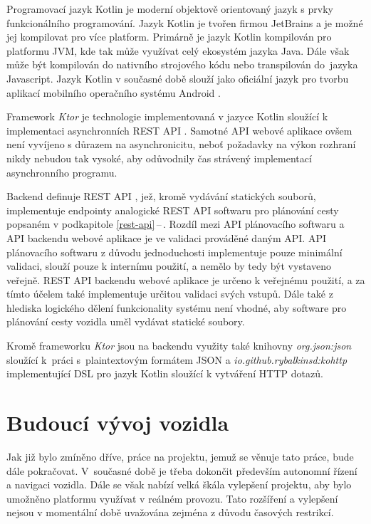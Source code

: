 \documentclass[czech, bachelor]{diploma}
\newcommand{\peteref}[1]{\ref{#1}\,--\,\nameref{#1}}
\begin{document}
Programovací jazyk Kotlin je moderní objektově orientovaný jazyk s prvky funkcionálního programování. Jazyk Kotlin je tvořen
firmou JetBrains a je možné jej kompilovat pro více platform. Primárně je jazyk Kotlin kompilován pro platformu JVM, kde tak může
využívat celý ekosystém jazyka Java. Dále však může být kompilován do nativního strojového kódu nebo transpilován do~jazyka
Javascript. Jazyk Kotlin v současné době slouží jako oficiální jazyk pro tvorbu aplikací mobilního operačního systému
Android \cite{kotlin-android-source}.

Framework \emph{Ktor} je technologie implementovaná v jazyce Kotlin sloužící k implementaci asynchronních
REST API \cite{ktor-source}. Samotné API webové aplikace ovšem není vyvíjeno s důrazem na asynchronicitu, neboť požadavky na výkon
rozhraní nikdy nebudou tak vysoké, aby odůvodnily čas strávený implementací asynchronního programu.

Backend definuje REST API \cite{rest-source}, jež, kromě vydávání statických souborů, implementuje endpointy analogické REST API
softwaru pro plánování cesty popsaném v podkapitole \peteref{rest-api}. Rozdíl mezi API plánovacího softwaru a API backendu
webové aplikace je ve validaci prováděné daným API. API plánovacího softwaru z důvodu jednoduchosti implementuje pouze minimální
validaci, slouží pouze k internímu použití, a nemělo by tedy být vystaveno veřejně. REST API backendu webové aplikace je určeno
k veřejnému použití, a za tímto účelem také implementuje určitou validaci svých vstupů. Dále také z hlediska logického dělení
funkcionality systému není vhodné, aby software pro plánování cesty vozidla uměl vydávat statické soubory.

Kromě frameworku \emph{Ktor} jsou na backendu využity také knihovny \emph{org.json:json} \cite{jsonjava-source} sloužící k~práci
s~plaintextovým formátem JSON \cite{json-source} a \emph{io.github.rybalkinsd:kohttp} \cite{kohttp-source} implementující DSL pro
jazyk Kotlin sloužící k vytváření HTTP dotazů.

\chapter{Budoucí vývoj vozidla}

Jak již bylo zmíněno dříve, práce na projektu, jemuž se věnuje tato práce, bude dále pokračovat. V~současné době je třeba dokončit
především autonomní řízení a navigaci vozidla. Dále se však nabízí velká škála vylepšení projektu, aby bylo umožněno platformu
využívat v reálném provozu. Tato rozšíření a vylepšení nejsou v momentální době uvažována zejména z důvodu časových restrikcí.
\end{document}
